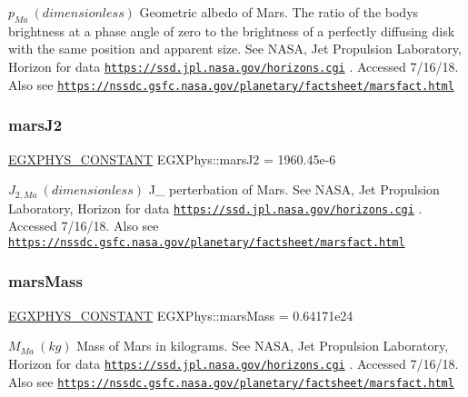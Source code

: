 $ p_{Ma} \ (dimensionless)$ Geometric albedo of Mars. The ratio of the body\textquotesingle{}s brightness at a phase angle of zero to the brightness of a perfectly diffusing disk with the same position and apparent size. See N\+A\+SA, Jet Propulsion Laboratory, Horizon for data \href{https://ssd.jpl.nasa.gov/horizons.cgi}{\tt https\+://ssd.\+jpl.\+nasa.\+gov/horizons.\+cgi} . Accessed 7/16/18. Also see \href{https://nssdc.gsfc.nasa.gov/planetary/factsheet/marsfact.html}{\tt https\+://nssdc.\+gsfc.\+nasa.\+gov/planetary/factsheet/marsfact.\+html} \mbox{\label{group___e_g_x_phys-_constants-_astrophysics-_solar_system-_mars-_bulk_ga28d6e310ea5b1ef018ad79d49a95350f}} 
\subsubsection{\texorpdfstring{mars\+J2}{marsJ2}}
{\footnotesize\ttfamily \mbox{\hyperlink{group___e_g_x_phys-_constants-_macros_ga76980d288494ce1714c9ac68a95ba702}{E\+G\+X\+P\+H\+Y\+S\+\_\+\+C\+O\+N\+S\+T\+A\+NT}} E\+G\+X\+Phys\+::mars\+J2 = 1960.\+45e-\/6}

$ J_{2,Ma} \ (dimensionless)$ J\+\_ perterbation of Mars. See N\+A\+SA, Jet Propulsion Laboratory, Horizon for data \href{https://ssd.jpl.nasa.gov/horizons.cgi}{\tt https\+://ssd.\+jpl.\+nasa.\+gov/horizons.\+cgi} . Accessed 7/16/18. Also see \href{https://nssdc.gsfc.nasa.gov/planetary/factsheet/marsfact.html}{\tt https\+://nssdc.\+gsfc.\+nasa.\+gov/planetary/factsheet/marsfact.\+html} \mbox{\label{group___e_g_x_phys-_constants-_astrophysics-_solar_system-_mars-_bulk_gacbdde45535f9e28a8a5d027480c9c6c8}} 
\subsubsection{\texorpdfstring{mars\+Mass}{marsMass}}
{\footnotesize\ttfamily \mbox{\hyperlink{group___e_g_x_phys-_constants-_macros_ga76980d288494ce1714c9ac68a95ba702}{E\+G\+X\+P\+H\+Y\+S\+\_\+\+C\+O\+N\+S\+T\+A\+NT}} E\+G\+X\+Phys\+::mars\+Mass = 0.\+64171e24}

$M_{Ma} \ (kg)$ Mass of Mars in kilograms. See N\+A\+SA, Jet Propulsion Laboratory, Horizon for data \href{https://ssd.jpl.nasa.gov/horizons.cgi}{\tt https\+://ssd.\+jpl.\+nasa.\+gov/horizons.\+cgi} . Accessed 7/16/18. Also see \href{https://nssdc.gsfc.nasa.gov/planetary/factsheet/marsfact.html}{\tt https\+://nssdc.\+gsfc.\+nasa.\+gov/planetary/factsheet/marsfact.\+html} \mbox{\label{group___e_g_x_phys-_constants-_astrophysics-_solar_system-_mars-_bulk_ga0401a539ddc5ee19e1b9d031a2257b98}} 
